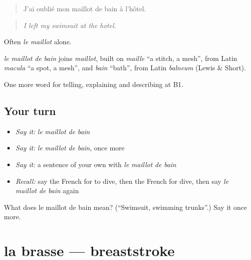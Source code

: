 \begin{quote}
J'ai oublié mon maillot de bain à l'hôtel.
\end{quote}

\begin{quote}
\emph{I left my swimsuit at the hotel.}
\end{quote}

Often \emph{le maillot} alone.

\begin{cousinweb}
\emph{le maillot de bain} joins \emph{maillot}, built on \emph{maille} \textquotedblleft{}a stitch, a mesh\textquotedblright{}, from Latin \emph{macula} \textquotedblleft{}a spot, a mesh\textquotedblright{}, and \emph{bain} \textquotedblleft{}bath\textquotedblright{}, from Latin \emph{balneum} (Lewis \& Short).
\end{cousinweb}

\begin{grammarlens}[title={What you've built}]
One more word for telling, explaining and describing at B1.
\end{grammarlens}

\subsection*{Your turn}
\begin{itemize}
\raggedright
  \item \emph{Say it:} \emph{le maillot de bain}
  \item \emph{Say it:} \emph{le maillot de bain}, once more
  \item \emph{Say it:} a sentence of your own with \emph{le maillot de bain}
  \item \emph{Recall:} say the French for to dive, then the French for dive, then say \emph{le maillot de bain} again
\end{itemize}

\begin{tcolorbox}[breakable,colback=teal!4,colframe=teal!35!black,title={Before you move on}]
What does le maillot de bain mean? (\textquotedblleft{}Swimsuit, swimming trunks\textquotedblright{}.) Say it once more.
\end{tcolorbox}
\section[la brasse]{la brasse — breaststroke}

\label{lesson:FR-C509-brasse}



